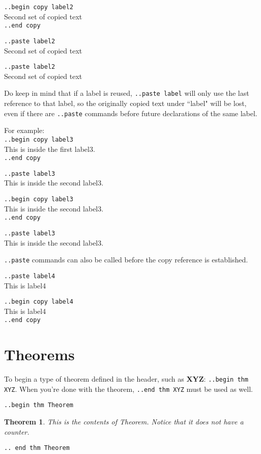 \documentclass[12pt]{article}
\newcommand{\nl}{\\}
\renewcommand\bold{\textbf}
\numberwithin{equation}{section}
\newtheorem*{Theorem}{Theorem}
\begin{document}
\bigskip

\verb|..begin copy label2| \nl
Second set of copied text \nl
\verb|..end copy|

\bigskip

\verb|..paste label2| \nl
Second set of copied text \nl

\medskip

\verb|..paste label2| \nl
Second set of copied text \nl

\bigskip

Do keep in mind that if a label is reused, \verb|..paste label| will only use the last reference to that label, so the originally copied text under ``label" will be lost, even if there are \verb|..paste| commands before future declarations of the same label.

\bigskip

For example: \nl
\verb|..begin copy label3|\nl
This is inside the first label3. \nl
\verb|..end copy|

\bigskip

\verb|..paste label3| \nl
This is inside the second label3. \nl

\bigskip

\verb|..begin copy label3|\nl
This is inside the second label3. \nl
\verb|..end copy|

\bigskip

\verb|..paste label3| \nl
This is inside the second label3. \nl

\bigskip

\verb|..paste| commands can also be called before the copy reference is established.

\verb|..paste label4| \nl
This is label4 \nl

\bigskip

\verb|..begin copy label4| \nl
This is label4 \nl
\verb|..end copy|

\newpage

\section{Theorems}

\bigskip

To begin a type of theorem defined in the header, such as \bold{XYZ}: \verb|..begin thm XYZ|. When you're done with the theorem, \verb|..end thm XYZ| must be used as well.

\medskip

\verb|..begin thm Theorem|
\begin{Theorem}
This is the contents of Theorem. Notice that it does not have a counter.
\end{Theorem}
\verb|.. end thm Theorem|
\end{document}
